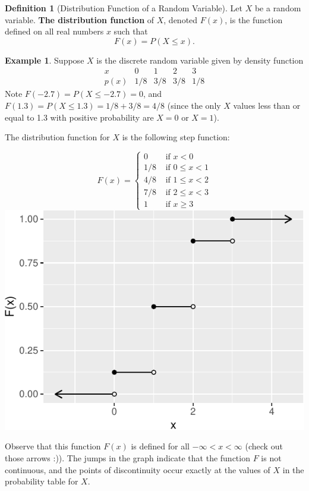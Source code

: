 \documentclass[
]{book}
\theoremstyle{definition}
\newtheorem{definition}{Definition}[chapter]
\theoremstyle{definition}
\newtheorem{example}{Example}[chapter]
\theoremstyle{definition}
\theoremstyle{definition}
\theoremstyle{remark}
\begin{document}
\begin{definition}[Distribution Function of a Random Variable]
\protect\hypertarget{def:distribution-function}{}\label{def:distribution-function}Let \(X\) be a random variable. \textbf{The distribution function} of \(X\), denoted \(F(x)\), is the function defined on all real numbers \(x\) such that \[F(x) = P(X \leq x).\]
\end{definition}

\begin{example}
Suppose \(X\) is the discrete random variable given by density function
\[
\begin{array}{c|c|c|c|c}
x & 0 & 1 & 2 & 3 \\ \hline
p(x) & 1/8 & 3/8 & 3/8 & 1/8 
\end{array}
\]
Note \(F(-2.7) = P(X \leq -2.7) = 0\), and \(F(1.3) = P(X \leq 1.3) = 1/8 + 3/8 = 4/8\) (since the only \(X\) values less than or equal to 1.3 with positive probability are \(X=0\) or \(X=1\)).

The distribution function for \(X\) is the following step function:

\[
F(x)=
\begin{cases}
0 &\text{ if }x < 0 \\
1/8  &\text{ if } 0 \leq x < 1 \\
4/8 &\text{ if } 1 \leq x < 2 \\
7/8 &\text{ if } 2 \leq x < 3 \\
1 &\text{ if } x \geq 3
\end{cases}
\]
\includegraphics{math340-notes_files/figure-latex/unnamed-chunk-13-1.pdf}

Observe that this function \(F(x)\) is defined for all \(-\infty < x < \infty\) (check out those arrows :)). The jumps in the graph indicate that the function \(F\) is not continuous, and the points of discontinuity occur exactly at the values of \(X\) in the probability table for \(X\).
\end{example}
\end{document}
